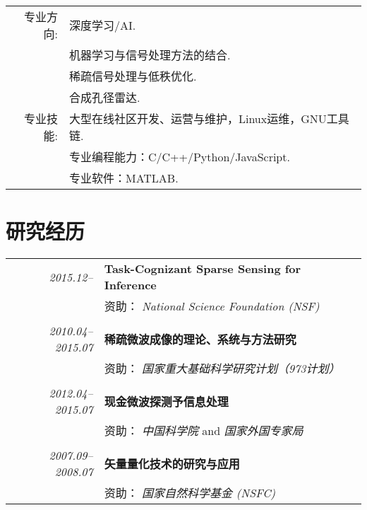 \documentclass[paper=a4,fontsize=11pt]{scrartcl}
\begin{document}
\begin{tabular}{rl}

专业方向: & 深度学习/AI.\\
	& 机器学习与信号处理方法的结合.\\
	& 稀疏信号处理与低秩优化.\\
	& 合成孔径雷达.\\

专业技能: & 大型在线社区开发、运营与维护，Linux运维，GNU工具链.\\
 	& 专业编程能力：C/C++/Python/JavaScript.\\
 	& 专业软件：MATLAB.
\end{tabular}

\section*{研究经历}

\begin{tabular}{r|p{11cm}}
	
	\emph{2015.12--} & \textbf{Task-Cognizant Sparse Sensing for Inference} \\
	& 资助： \emph{National Science Foundation (NSF)}\\
	\multicolumn{2}{c}{} \\
	
	
	
	\emph{2010.04--2015.07} & \textbf{稀疏微波成像的理论、系统与方法研究} \\
	& 资助： \emph{国家重大基础科学研究计划（973计划）}\\
	\multicolumn{2}{c}{} \\
	
	\emph{2012.04--2015.07} & \textbf{现金微波探测予信息处理} \\
	& 资助： \emph{中国科学院} and \emph{国家外国专家局}\\
	\multicolumn{2}{c}{} \\
	
	
	\emph{2007.09--2008.07} & \textbf{矢量量化技术的研究与应用} \\
	& 资助： \emph{国家自然科学基金 (NSFC)}\\
	
	
\end{tabular}
\end{document}

